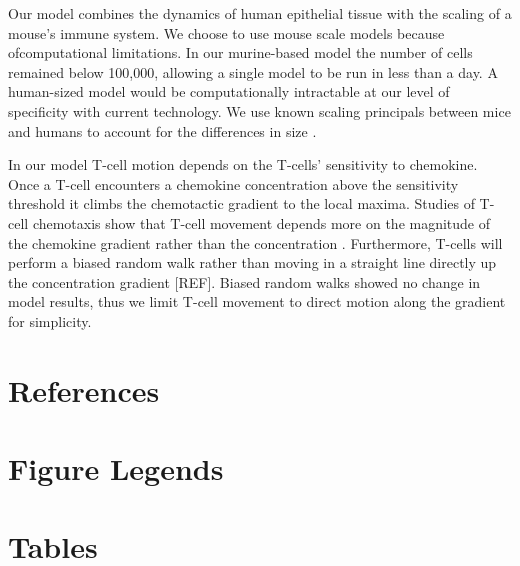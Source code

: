 \documentclass[10pt]{article}
\begin{document}
Our model combines the dynamics of human epithelial tissue with the scaling of a mouse's immune system.  We choose to use mouse scale models because ofcomputational limitations.  In our murine-based model the number of cells remained below 100,000, allowing a single model to be run in less than a day.  A human-sized model would be computationally intractable at our level of specificity with current technology.  We use known scaling principals between mice and humans to account for the differences in size \cite{Banerjee2010b}.

In our model T-cell motion depends on the T-cells' sensitivity to chemokine.  Once a T-cell encounters a chemokine concentration above the sensitivity threshold it climbs the chemotactic gradient to the local maxima.  Studies of T-cell chemotaxis show that T-cell movement depends more on the magnitude of the chemokine gradient rather than the concentration \cite{Gao2003}.  Furthermore, T-cells will perform a biased random walk rather than moving in a straight line directly up the concentration gradient [REF].  Biased random walks showed no change in model results, thus we limit T-cell movement to direct motion along the gradient for simplicity.


\section*{References}


\section*{Figure Legends}


\section*{Tables}
\end{document}
